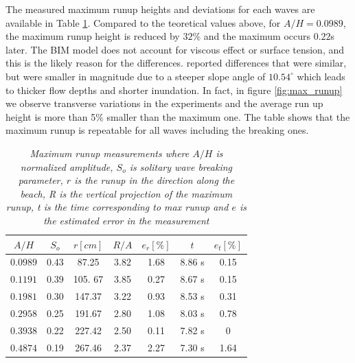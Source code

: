 \documentclass[a4paper, 11pt, english, twoside, openright]{article}
\begin{document}
The measured maximum runup heights and deviations for each waves are available in Table \ref{tab:max_shore}. Compared to the teoretical values above, for $A/H=0.0989$,  the maximum runup height is reduced by $32$\% and the maximum occurs $0.22$s later.  The BIM model does not account for viscous effect or surface tension, and this is the likely reason for the differences. \cite{pedersen2013runup} reported differences that were similar, but were smaller in magnitude due to a steeper 
slope angle of $10.54 ^\circ$ which leads to thicker flow depths and shorter inundation. In fact, in figure \ref{fig:max_runup} we observe transverse variations in the experiments and the average
run up height is more than 5\% smaller than the maximum one.  The table shows that the maximum runup is repeatable for all waves including the breaking ones. %
\begin{table}[]
\caption{\textit{Maximum runup measurements where $A/H$ is normalized amplitude, $S_o $ is \citep{grilli1997breaking} solitary wave breaking parameter, $r$ is the runup in the direction along the beach, R is the vertical projection of the maximum runup, t is the time corresponding to max runup and $e$ is the estimated error in the measurement }}
\centering
\begin{tabular}{ccccccc}
\hline
         $A/H$& \textbf{$S_o$}     & $r [cm]$ &$R/A$ & $e_r [\%]$ & $t$ & $e_t [\%]$ \\ \hline
\textit{$0.0989$} &0.43 & 87.25    &    3.82  & 1.68             & 8.86 s        & 0.15               \\
\textit{$0.1191$} &0.39 & 105. 67   &    3.85   & 0.27             & 8.67 s        & 0.15               \\
\textit{$0.1981$} &0.30 & 147.37    &    3.22  & 0.93            & 8.53 s        & 0.31                \\
\textit{$0.2958$} &0.25 & 191.67     &   2.80  & 1.08           & 8.03 s        & 0.78              \\
\textit{$0.3938$} &0.22 & 227.42      &   2.50 & 0.11            & 7.82 s        & 0              \\
\textit{$0.4874$} &0.19 & 267.46       &    2.37 & 2.27            & 7.30 s        & 1.64              
\end{tabular}
\label{tab:max_shore}
\end{table}
\end{document}

